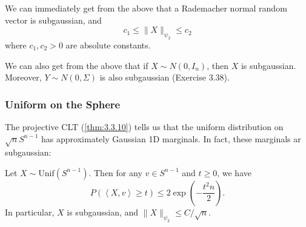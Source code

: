 \begin{example}[Rademacher]
\label{ex:3.4.3}
We can immediately get from the above that a Rademacher normal random vector is subgaussian, and 
\[ c_1 \leq \lVert X \rVert_{\psi_2} \leq c_2 \]
where $c_1, c_2 > 0$ are absolute constants.
\end{example}

\begin{example}[Normal]
\label{ex:3.4.4}
We can also get from the above that if $X \sim N(0, I_n)$, then $X$ is subgaussian. Moreover, 
$Y \sim N(0, \Sigma)$ is also subgaussian (Exercise 3.38).
\end{example}

\subsubsection{Uniform on the Sphere}
The projective CLT (\cref{thm:3.3.10}) tells us that the uniform distribution on $\sqrt{n}S^{n - 1}$ has 
approximately Gaussian 1D marginals. In fact, these marginals ar subgaussian:

\begin{theorem}
\label{thm:3.4.5}
Let $X \sim \mathrm{Unif}(S^{n - 1})$. Then for any $v \in S^{n - 1}$ and $t \geq 0$, we have 
\[ P(\left\langle X, v \right\rangle \geq t) \leq 2\exp{\left( -\frac{t^2 n}{2} \right)}. \]
In particular, $X$ is subgaussian, and $\lVert X \rVert_{\psi_2} \leq C / \sqrt{n}$.
\end{theorem}

